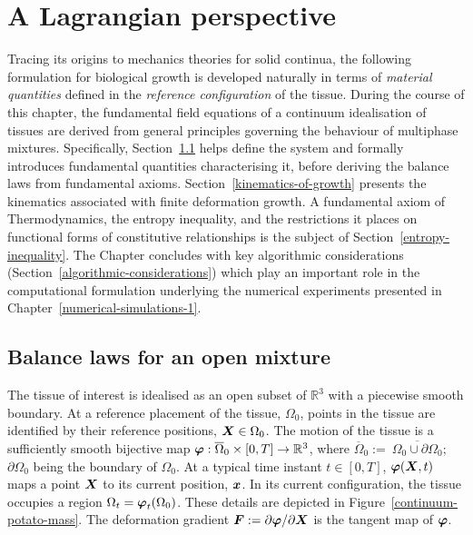 \chapter{A Lagrangian perspective}
\label{lagrangian-perspective}

Tracing its origins to mechanics theories for solid continua, the
following formulation for biological growth is developed naturally in
terms of {\em material quantities} defined in the {\em reference
  configuration} of the tissue. During the course of this chapter, the
fundamental field equations of a continuum idealisation of tissues are
derived from general principles governing the behaviour of multiphase
mixtures. Specifically, Section~\ref{balance-laws} helps define the
system and formally introduces fundamental quantities characterising
it, before deriving the balance laws from fundamental
axioms. Section~\ref{kinematics-of-growth} presents the kinematics
associated with finite deformation growth. A fundamental axiom of
Thermodynamics, the entropy inequality, and the restrictions it places
on functional forms of constitutive relationships is the subject of
Section~\ref{entropy-inequality}. The Chapter concludes with key
algorithmic considerations (Section~\ref{algorithmic-considerations})
which play an important role in the computational formulation
underlying the numerical experiments presented in
Chapter~\ref{numerical-simulations-1}.

\section{Balance laws for an open mixture}
\label{balance-laws}

The tissue of interest is idealised as an open subset of
$\mathbb{R}^3$ with a piecewise smooth boundary. At a reference
placement of the tissue, $\Omega_0$, points in the tissue are
identified by their reference positions, $\mbox{\boldmath$ X$} \in \Omega_0$. The
motion of the tissue is a sufficiently smooth bijective map $\mbox{\boldmath$\varphi$}:
\overline{\Omega}_0 \times [0,T] \rightarrow \mathbb{R}^3$, where
$\overline{\Omega}_0 :=\ \overline{\Omega_0\cup\partial\Omega_0}$;
$\partial\Omega_0$ being the boundary of $\Omega_0$. At a typical time
instant $t \in [0,T]$, $\mbox{\boldmath$\varphi$}(\mbox{\boldmath$ X$},t)$ maps a point $\mbox{\boldmath$ X$}$ to its
current position, $\mbox{\boldmath$ x$}$. In its current configuration, the tissue
occupies a region $\Omega_t = \mbox{\boldmath$\varphi$}_t (\Omega_0)$. These details
are depicted in Figure~\ref{continuum-potato-mass}. The deformation
gradient $\mbox{\boldmath$ F$} := \partial \mbox{\boldmath$\varphi$}/ \partial\mbox{\boldmath$ X$}$ is the tangent map of
$\mbox{\boldmath$\varphi$}$.

